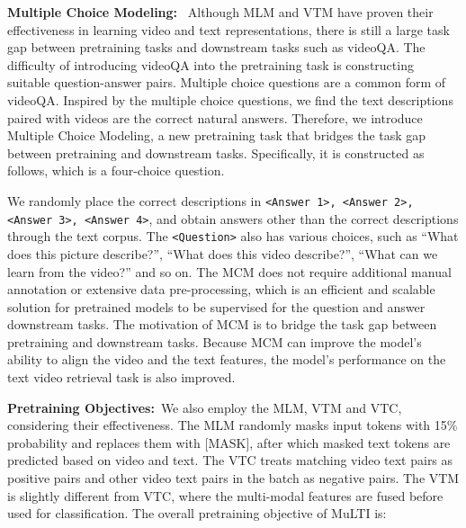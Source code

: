 \documentclass[10pt,twocolumn,letterpaper]{article}
\begin{document}
\textbf{Multiple Choice Modeling:}~
Although MLM and VTM have proven their effectiveness in learning video and text representations, there is still a large task gap between pretraining tasks and downstream tasks such as videoQA.
The difficulty of introducing videoQA into the pretraining task is constructing suitable question-answer pairs.
Multiple choice questions are a common form of videoQA. Inspired by the multiple choice questions, we find the text descriptions paired with videos are the correct natural answers.
Therefore, we introduce Multiple Choice Modeling, a new pretraining task that bridges the task gap between pretraining and downstream tasks. Specifically, it is constructed as follows, which is a four-choice question.


We randomly place the correct descriptions in \texttt{<Answer 1>, <Answer 2>, <Answer 3>, <Answer 4>}, and obtain answers other than the correct descriptions through the text corpus. The \texttt{<Question>} also has various choices, such as ``What does this picture describe?'', ``What does this video describe?'', ``What can we learn from the video?'' and so on. 
The MCM does not require additional manual annotation or extensive data pre-processing, which is an efficient and scalable solution for pretrained models to be supervised for the question and answer downstream tasks.  
The motivation of MCM is to bridge the task gap between pretraining and downstream tasks. Because MCM can improve the model's ability to align the video and the text features, the model's performance on the text video retrieval task is also improved.


\textbf{Pretraining Objectives:}~We also employ the MLM, VTM and VTC, considering their effectiveness.  
The MLM randomly masks input tokens with 15\% probability and replaces them with [MASK], after which masked text tokens are predicted based on video and text.
The VTC treats matching video text pairs as positive pairs and other video text pairs in the batch as negative pairs.
The VTM is slightly different from VTC, where the multi-modal features are fused before used for classification. 
The overall pretraining objective of MuLTI is:

\vspace{-2ex}

\vspace{-4ex}
\end{document}
